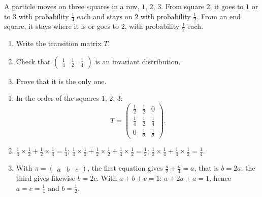 \begin{exercise}
A particle moves on three squares in a row, $1$, $2$, $3$. From square $2$, it goes to $1$ or to $3$ with probability $\frac14$ each and stays on $2$ with probability $\frac12$. From an end square, it stays where it is or goes to $2$, with probability $\frac12$ each.
\begin{enumerate}
\item Write the transition matrix $T$.
\item Check that $\begin{pmatrix}\frac14&\frac12&\frac14\end{pmatrix}$ is an invariant distribution.
\item Prove that it is the only one.
\end{enumerate}
\end{exercise}
\begin{solution}
\begin{enumerate}
\item In the order of the squares $1$, $2$, $3$: \[T=\begin{pmatrix}\frac12&\frac12&0\\\frac14&\frac12&\frac14\\0&\frac12&\frac12\end{pmatrix}.\]
\item $\frac14\times\frac12+\frac12\times\frac14=\frac14$; $\frac14\times\frac12+\frac12\times\frac12+\frac14\times\frac12=\frac12$; $\frac12\times\frac14+\frac14\times\frac12=\frac14$.
\item With $\pi=\begin{pmatrix}a&b&c\end{pmatrix}$, the first equation gives $\frac a2+\frac b4=a$, that is $b=2a$; the third gives likewise $b=2c$. With $a+b+c=1$: $a+2a+a=1$, hence $a=c=\frac14$ and $b=\frac12$.
\end{enumerate}
\end{solution}

